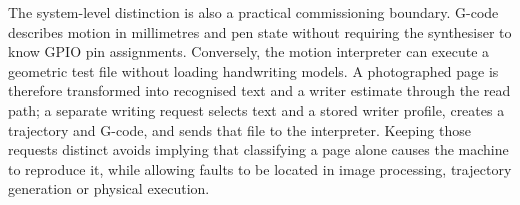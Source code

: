 The system-level distinction is also a practical commissioning boundary. G-code describes motion in millimetres and pen state without requiring the synthesiser to know GPIO pin assignments. Conversely, the motion interpreter can execute a geometric test file without loading handwriting models. A photographed page is therefore transformed into recognised text and a writer estimate through the read path; a separate writing request selects text and a stored writer profile, creates a trajectory and G-code, and sends that file to the interpreter. Keeping those requests distinct avoids implying that classifying a page alone causes the machine to reproduce it, while allowing faults to be located in image processing, trajectory generation or physical execution.
\FloatBarrier
